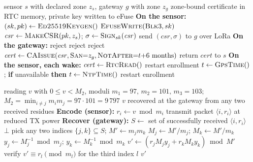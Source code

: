 \begin{widealg}
\caption{Stage 3: sensor enrollment through the zone gateway}
\label{alg:enroll}
\small
\begin{algorithmic}[1]
\Require sensor $s$ with declared zone $z_s$, gateway $g$ with zone $z_g$
\Ensure zone-bound certificate in RTC memory, private key written to eFuse
\Statex \textbf{On the sensor:}
\State $(sk, pk) \gets \textsc{Ed25519Keygen}()$
\State $\textsc{EfuseWrite}(\textsc{Blk}3, sk)$
\State $\mathit{csr} \gets \textsc{MakeCSR}(pk, z_s)$;\;
       $\sigma \gets \textsc{Sign}_{sk}(\mathit{csr})$
\State send $(\mathit{csr}, \sigma)$ to $g$ over LoRa
\Statex \textbf{On the gateway:}
  \State \Return reject 
\EndIf
{}
  \State \Return reject
\EndIf
{}
  \State \Return reject
\EndIf
\State $\mathit{cert} \gets \textsc{CAIssue}(\mathit{csr},
        \textsc{San}{=}z_g, \textsc{NotAfter}{=}t{+}6\text{ months})$
\State return $\mathit{cert}$ to $s$
\Statex \textbf{On the sensor, each wake:}
\State $\mathit{cert} \gets \textsc{RtcRead}()$
  \State restart enrollment 
\EndIf
\State $t \gets \textsc{GpsTime}()$;\;
       \textbf{if} unavailable \textbf{then} $t \gets \textsc{NtpTime}()$
  \State restart enrollment
\EndIf
\end{algorithmic}
\end{widealg}
\begin{widealg}
\caption{Residue encoding and two-of-three recovery}
\label{alg:crt}
\small
\begin{algorithmic}[1]
\Require reading $v$ with $0 \le v < M_2$, moduli
  $m_1{=}97,\, m_2{=}101,\, m_3{=}103$;\;
  $M_2 = \min_{i \neq j} m_i m_j = 97 \cdot 101 = 9\,797$
\Ensure $v$ recovered at the gateway from any two received residues
\Statex \textbf{Encode (sensor):}
  \State $r_i \gets v \bmod m_i$ 
  \State transmit packet $\langle i, r_i \rangle$ at reduced TX power
\EndFor
\Statex \textbf{Recover (gateway):}
\State $S \gets$ set of successfully received $\langle i, r_i\rangle$
  \State \Return $\bot$ 
\EndIf
\State pick any two indices $\{j,k\} \subseteq S$;\;
       $M' \gets m_j m_k$
\State $M_j \gets M'/m_j$;\; $M_k \gets M'/m_k$
\State $y_j \gets M_j^{-1} \bmod m_j$;\;
       $y_k \gets M_k^{-1} \bmod m_k$
\State $v' \gets (r_j M_j y_j + r_k M_k y_k) \bmod M'$
  \State verify $v' \equiv r_l \pmod{m_l}$ for the third index $l$
\EndIf
\State \Return $v'$
\end{algorithmic}
\end{widealg}
